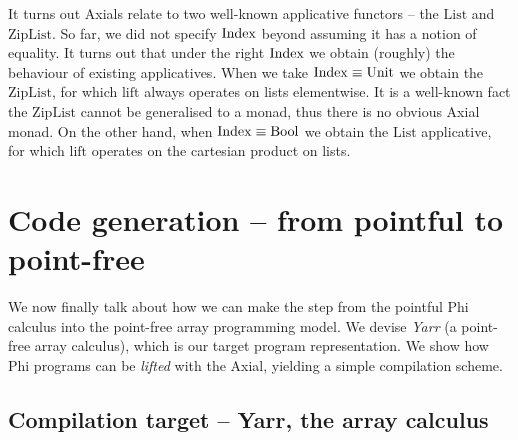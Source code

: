 It turns out Axials relate to two well-known applicative functors -- the $\mathrm{List}$ and $\mathrm{ZipList}$. 
So far, we did not specify $\mathrm{Index}$ beyond assuming it has a notion of equality. 
It turns out that under the right $\mathrm{Index}$ we obtain (roughly) the behaviour of existing applicatives.
When we take $\mathrm{Index} \equiv \mathrm{Unit}$ we obtain the $\mathrm{ZipList}$, for which $\mathrm{lift}$ always operates on lists elementwise.
It is a well-known fact the $\mathrm{ZipList}$ cannot be generalised to a monad, thus there is no obvious Axial monad.
On the other hand, when $\mathrm{Index} \equiv \mathrm{Bool}$ we obtain the $\mathrm{List}$ applicative, for which $\mathrm{lift}$ operates on the cartesian product on lists. 

\section{Code generation -- from pointful to point-free}
\label{codegen}

We now finally talk about how we can make the step from the pointful Phi calculus into the point-free array programming model. 
We devise \textit{Yarr} (a point-free array calculus), which is our target program representation. 
We show how Phi programs can be \textit{lifted} with the Axial, yielding a simple compilation scheme.

\subsection{Compilation target -- Yarr, the array calculus}
\label{yarr}

